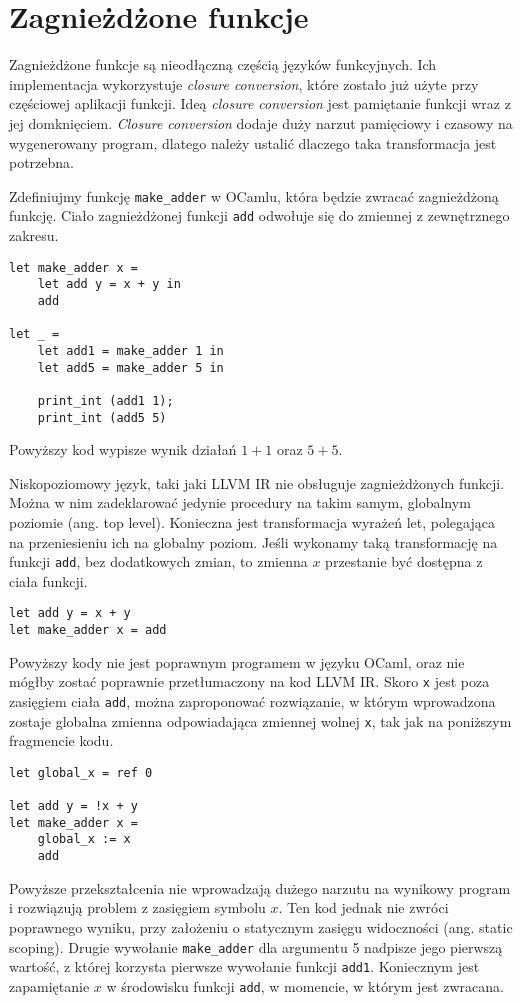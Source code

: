 \documentclass[declaration,shortabstract]{iithesis}
\begin{document}

\section{Zagnieżdżone funkcje}

Zagnieżdżone funkcje są nieodłączną częścią języków funkcyjnych. Ich implementacja wykorzystuje 
\textit{closure conversion}, które zostało już użyte przy częściowej aplikacji funkcji. 
Ideą \textit{closure conversion} jest pamiętanie funkcji wraz z jej domknięciem. 
\textit{Closure conversion} dodaje duży narzut pamięciowy i czasowy na wygenerowany program,
dlatego należy ustalić dlaczego taka transformacja jest potrzebna.

Zdefiniujmy funkcję \texttt{make\_adder} w OCamlu, która będzie zwracać 
zagnieżdżoną funkcję.
Ciało zagnieżdżonej funkcji \texttt{add} odwołuje się do zmiennej z 
zewnętrznego zakresu.
\begin{lstlisting}[frame=lines]
let make_adder x = 
    let add y = x + y in 
    add 
  
let _ = 
    let add1 = make_adder 1 in 
    let add5 = make_adder 5 in 
    
    print_int (add1 1);
    print_int (add5 5) 
\end{lstlisting}
Powyższy kod wypisze wynik działań $1 + 1$ oraz $5 + 5$. 

Niskopoziomowy język, taki jaki LLVM IR nie obsługuje zagnieżdżonych 
funkcji. Można w
nim zadeklarować jedynie procedury na takim samym, globalnym poziomie (ang. 
top level). 
Konieczna jest transformacja wyrażeń let, polegająca na przeniesieniu 
ich na globalny poziom. 
Jeśli wykonamy taką transformację na funkcji \texttt{add}, bez dodatkowych 
zmian, to zmienna $x$
przestanie być dostępna z ciała funkcji.

\begin{lstlisting}[frame=lines]
let add y = x + y 
let make_adder x = add 
\end{lstlisting}
Powyższy kody nie jest poprawnym programem w języku OCaml, oraz 
nie mógłby zostać poprawnie przetłumaczony na kod LLVM IR. 
Skoro \texttt{x} jest poza zasięgiem ciała \texttt{add}, można zaproponować rozwiązanie,
w którym wprowadzona zostaje globalna zmienna odpowiadająca zmiennej wolnej 
\texttt{x}, tak jak na poniższym fragmencie kodu.

\begin{lstlisting}[frame=lines]
let global_x = ref 0

let add y = !x + y 
let make_adder x = 
    global_x := x
    add 
\end{lstlisting}
Powyższe przekształcenia nie wprowadzają dużego narzutu na wynikowy program i rozwiązują 
problem z zasięgiem symbolu $x$. Ten kod jednak nie zwróci poprawnego wyniku, 
przy założeniu o statycznym zasięgu widoczności (ang. static scoping). Drugie 
wywołanie \texttt{make\_adder} dla argumentu 5 nadpisze jego pierwszą wartość, 
z której korzysta pierwsze wywołanie funkcji \texttt{add1}. 
Koniecznym jest zapamiętanie $x$ w środowisku funkcji 
\texttt{add}, w momencie, w którym jest zwracana. 
\end{document}

